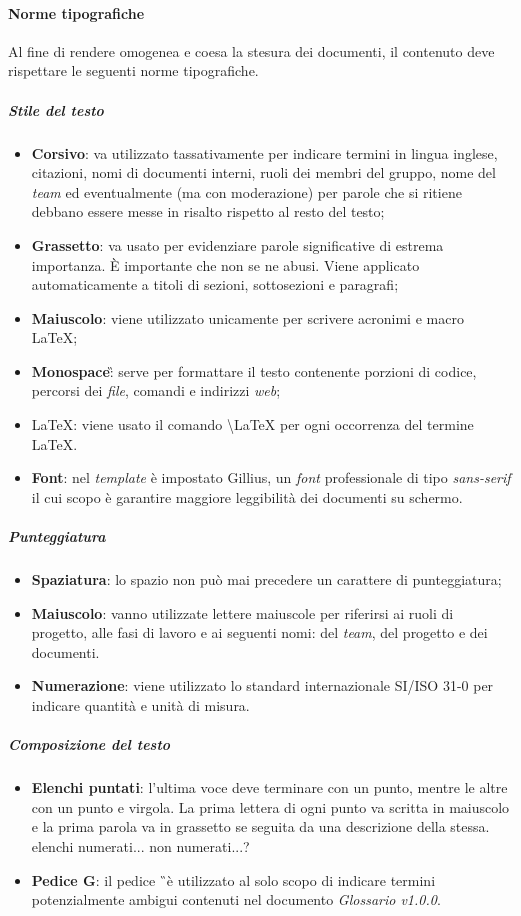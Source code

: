 \paragraph{Norme tipografiche}
\label{sec:normeTipografiche}
Al fine di rendere omogenea e coesa la stesura dei documenti, il contenuto deve rispettare le seguenti norme tipografiche.
\subparagraph{Stile del testo}
\begin{itemize}
\item \textbf{Corsivo}: va utilizzato tassativamente per indicare termini in lingua inglese, citazioni, nomi di documenti interni, ruoli dei membri del gruppo, nome del \textit{team} ed eventualmente (ma con moderazione) per parole che si ritiene debbano essere messe in risalto rispetto al resto del testo; 
\item \textbf{Grassetto}: va usato per evidenziare parole significative di estrema importanza. È importante che non se ne abusi. Viene applicato automaticamente a titoli di sezioni, sottosezioni e paragrafi; 
\item \textbf{Maiuscolo}: viene utilizzato unicamente per scrivere acronimi e macro \LaTeX; 
\item \textbf{Monospace}\G: serve per formattare il testo contenente porzioni di codice, percorsi dei \textit{file}, comandi e indirizzi \textit{web};
\item \LaTeX: viene usato il comando \textbackslash LaTeX per ogni occorrenza del termine \LaTeX.
\item \textbf{Font}: nel \textit{template} è impostato Gillius, un \textit{font} professionale di tipo \textit{sans-serif} il cui scopo è garantire maggiore leggibilità dei documenti su schermo.  
\end{itemize}
\subparagraph{Punteggiatura}
\begin{itemize}
\item \textbf{Spaziatura}: lo spazio non può mai precedere un carattere di punteggiatura; 
\item \textbf{Maiuscolo}: vanno utilizzate lettere maiuscole per riferirsi ai ruoli di progetto, alle fasi di lavoro e ai seguenti nomi: del \textit{team}, del progetto e dei documenti. 
\item \textbf{Numerazione}: viene utilizzato lo standard internazionale SI/ISO 31-0 per indicare quantità e unità di misura.
\end{itemize} 
\subparagraph{Composizione del testo}
\begin{itemize}
	\item {\textbf{Elenchi puntati}}: l’ultima voce deve terminare con un punto, mentre le altre con un punto e virgola. La prima lettera di ogni punto va scritta in maiuscolo e la prima parola va in grassetto se seguita da una descrizione della stessa.
	elenchi numerati... non numerati...?
	\item \textbf{Pedice G}: il pedice \G\ è utilizzato al solo scopo di indicare termini potenzialmente ambigui contenuti nel documento \textit{Glossario v1.0.0}.
\end{itemize}

